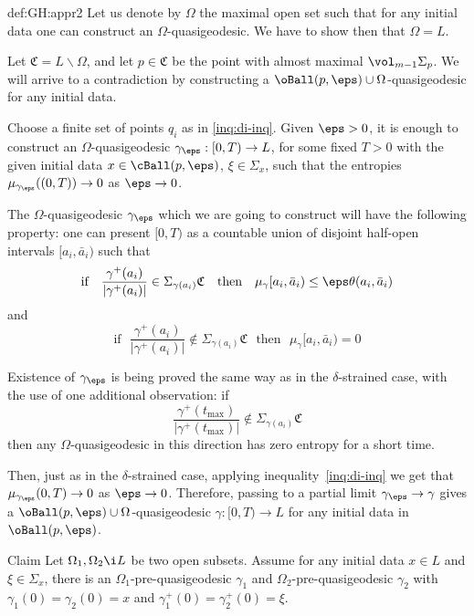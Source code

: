 {\begin{subthm}{def:GH:appr2}
Let us denote by $\Omega$ the maximal open set such that for any initial data
one can construct an $\Omega$-quasigeodesic. 
We have to show then that $\Omega=L$. 

Let $\mathfrak C=L\backslash \Omega$, and let $p\in \mathfrak C$ be the point
with almost maximal $\vol_{m-1} \Sigma_p$. 
We will arrive to a contradiction by constructing  a $\oBall(p,\eps)\cup\Omega$-quasigeodesic for any initial data. 

Choose a finite set of points $q_i$ as in \ref{inq:di-inq}.
Given $\eps>0$, it is enough to construct an $\Omega$-quasigeodesic
$\gamma_\eps:[0,T)\to L$, for some fixed $T>0$ with the given initial data $x\in
\cBall(p,\eps)$, $\xi\in \Sigma_x$, such that the entropies
$\mu_{\gamma_\eps}((0,T))\to 0$ as $\eps\to0$.
 
The $\Omega$-quasigeodesic $\gamma_\eps$ which we are going to construct will
have the following property: one can present $[0,T)$ as a countable union of disjoint
half-open intervals $[a_i,\bar a_i)$ such that 
$$\text{if}\ \ \
\frac{\gamma^+(a_i)}{|\gamma^+(a_i)|}\in \Sigma_{\gamma(a_i)}\mathfrak C \ \ \
\text{then}\ \ \   \mu_\gamma[a_i,\bar a_i)\le \eps\theta(a_i,\bar a_i)$$ 
and
$$\text{if}\ \ \ \frac{\gamma^+(a_i)}{|\gamma^+(a_i)|}\not\in
\Sigma_{\gamma(a_i)}\mathfrak C\ \ \ \text{then}\ \ \ \mu_\gamma[a_i,\bar a_i)=0$$

Existence of $\gamma_\eps$ is being proved the same way as in the $\delta$-strained case,
with the use of one additional observation:
if $$\frac{\gamma^+(t_{\max})}{|\gamma^+(t_{\max})|}\not\in
\Sigma_{\gamma(a_i)}\mathfrak C$$ then any $\Omega$-quasigeodesic in this direction
has zero entropy for a short time.

Then, just as in the $\delta$-strained case, applying
inequality~\ref{inq:di-inq} we get that $\mu_{\gamma_{\eps}}(0,T)\to0$ as
$\eps\to 0$. 
Therefore, passing to a partial limit $\gamma_\eps\to\gamma$ gives a
$\oBall(p,\eps)\cup\Omega$-quasigeodesic $\gamma:[0,T)\to L$ for any initial data in
$\oBall(p,\eps)$.\qeds












\begin{thm}{Claim}
Let $\Omega_1, \Omega_2\i L$ be two open subsets.
Assume for any initial data $x\in L$ and $\xi\in\Sigma_x$, there is an $\Omega_1$-pre-quasigeodesic $\gamma_1$ and $\Omega_2$-pre-quasigeodesic $\gamma_2$ with
$\gamma_1(0)=\gamma_2(0)=x$ and $\gamma_1^+(0)=\gamma_2^+(0)=\xi$.


\end{thm}
\end{subthm}}

